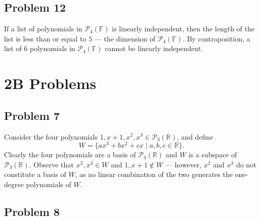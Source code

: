 \documentclass[11pt]{article}
\begin{document}

\subsection{Problem 12}

If a list of polynomials in $\mathcal{P}_{4}(\mathbb{F})$ is linearly independent, then the length of the list is less than or equal to $5$ --- the dimension of $\mathcal{P}_{4}(\mathbb{F})$. By contraposition, a list of $6$ polynomials in $\mathcal{P}_{4}(\mathbb{F})$ cannot be linearly independent. 


\section{2B Problems}


\subsection{Problem 7}

Consider the four polynomials $1, x + 1, x^{2}, x^{3} \in \mathcal{P}_{3}(\mathbb{R})$, and define 
\[ 
	W = \{ {ax^{3} + bx^{2} + cx \mid a, b, c \in \mathbb{R}} \}.
\]
Clearly the four polynomials are a basis of $\mathcal{P}_{3}(\mathbb{R})$ and $W$ is a subspace of $\mathcal{P}_{3}(\mathbb{R})$. Observe that $x^{2}, x^{3} \in W$ and $1, x + 1 \notin W$ --- however, $x^{2}$ and $x^{3}$ do not constitute a basis of $W$, as no linear combination of the two generates the one-degree polynomials of $W$.



\subsection{Problem 8}
\end{document}
